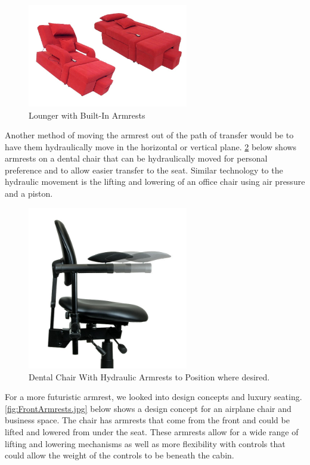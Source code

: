 \begin{figure}[h]
  \centering
     \includegraphics[width=7cm]{images/LoungerArmrest.jpg}
   \caption{Lounger with Built-In Armrests \cite{lounger}}
  \label{fig:LoungerArmrest.jpg}
\end{figure}


Another method of moving the armrest out of the path of transfer would be to have them hydraulically move in the horizontal or vertical plane. \ref{fig:dentalchairarmrest.jpg} below shows armrests on a dental chair that can be hydraulically moved for personal preference and to allow easier transfer to the seat. Similar technology to the hydraulic movement is the lifting and lowering of an office chair using air pressure and a piston.   



\begin{figure}[h]
  \centering
     \includegraphics[width=7cm]{images/dentalchairarmrest.jpg}
   \caption{Dental Chair With Hydraulic Armrests to Position where desired. \cite{dental}}
  \label{fig:dentalchairarmrest.jpg}
\end{figure}

For a more futuristic armrest, we looked into design concepts and luxury seating.  \ref{fig:FrontArmrests.jpg} below shows a design concept for an airplane chair and business space.  The chair has armrests that come from the front and could be lifted and lowered from under the seat.  These armrests allow for a wide range of lifting and lowering mechanisms as well as more flexibility with controls that could allow the weight of the controls to be beneath the cabin.


